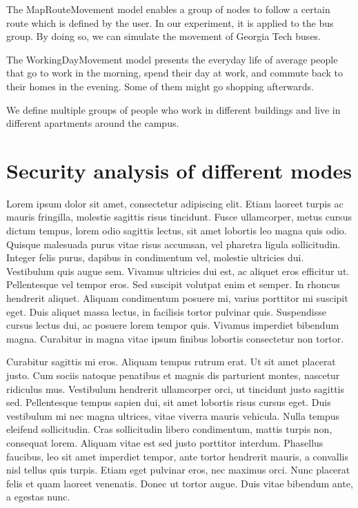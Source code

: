 \documentclass[conference]{IEEEtran}
\begin{document}
The MapRouteMovement model enables a group of nodes to follow a certain route which is defined by the user. In our experiment, it is applied to the bus group. By doing so, we can simulate the movement of Georgia Tech buses.

The WorkingDayMovement model presents the everyday life of average people that go to work in the morning, spend their day at work, and commute back to their homes in the evening. Some of them might go shopping afterwards.

We define multiple groups of people who work in different buildings and live in different apartments around the campus.

\section{Security analysis of different modes}

Lorem ipsum dolor sit amet, consectetur adipiscing elit. Etiam laoreet turpis ac mauris fringilla, molestie sagittis risus tincidunt. Fusce ullamcorper, metus cursus dictum tempus, lorem odio sagittis lectus, sit amet lobortis leo magna quis odio. Quisque malesuada purus vitae risus accumsan, vel pharetra ligula sollicitudin. Integer felis purus, dapibus in condimentum vel, molestie ultricies dui. Vestibulum quis augue sem. Vivamus ultricies dui est, ac aliquet eros efficitur ut. Pellentesque vel tempor eros. Sed suscipit volutpat enim et semper. In rhoncus hendrerit aliquet. Aliquam condimentum posuere mi, varius porttitor mi suscipit eget. Duis aliquet massa lectus, in facilisis tortor pulvinar quis. Suspendisse cursus lectus dui, ac posuere lorem tempor quis. Vivamus imperdiet bibendum magna. Curabitur in magna vitae ipsum finibus lobortis consectetur non tortor.

Curabitur sagittis mi eros. Aliquam tempus rutrum erat. Ut sit amet placerat justo. Cum sociis natoque penatibus et magnis dis parturient montes, nascetur ridiculus mus. Vestibulum hendrerit ullamcorper orci, ut tincidunt justo sagittis sed. Pellentesque tempus sapien dui, sit amet lobortis risus cursus eget. Duis vestibulum mi nec magna ultrices, vitae viverra mauris vehicula. Nulla tempus eleifend sollicitudin. Cras sollicitudin libero condimentum, mattis turpis non, consequat lorem. Aliquam vitae est sed justo porttitor interdum. Phasellus faucibus, leo sit amet imperdiet tempor, ante tortor hendrerit mauris, a convallis nisl tellus quis turpis. Etiam eget pulvinar eros, nec maximus orci. Nunc placerat felis et quam laoreet venenatis. Donec ut tortor augue. Duis vitae bibendum ante, a egestas nunc.
\end{document}
